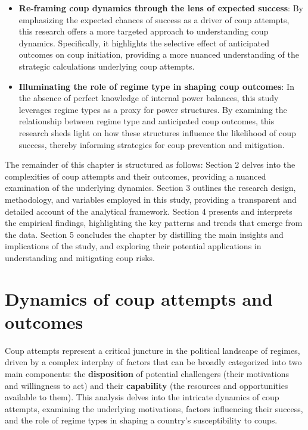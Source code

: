 \documentclass[
  12pt,
]{report}
\begin{document}
\begin{itemize}
\item
  \textbf{Re-framing coup dynamics through the lens of expected
  success}: By emphasizing the expected chances of success as a driver
  of coup attempts, this research offers a more targeted approach to
  understanding coup dynamics. Specifically, it highlights the selective
  effect of anticipated outcomes on coup initiation, providing a more
  nuanced understanding of the strategic calculations underlying coup
  attempts.
\item
  \textbf{Illuminating the role of regime type in shaping coup
  outcomes}: In the absence of perfect knowledge of internal power
  balances, this study leverages regime types as a proxy for power
  structures. By examining the relationship between regime type and
  anticipated coup outcomes, this research sheds light on how these
  structures influence the likelihood of coup success, thereby informing
  strategies for coup prevention and mitigation.
\end{itemize}

The remainder of this chapter is structured as follows: Section 2 delves
into the complexities of coup attempts and their outcomes, providing a
nuanced examination of the underlying dynamics. Section 3 outlines the
research design, methodology, and variables employed in this study,
providing a transparent and detailed account of the analytical
framework. Section 4 presents and interprets the empirical findings,
highlighting the key patterns and trends that emerge from the data.
Section 5 concludes the chapter by distilling the main insights and
implications of the study, and exploring their potential applications in
understanding and mitigating coup risks.

\section{Dynamics of coup attempts and
outcomes}\label{dynamics-of-coup-attempts-and-outcomes}

Coup attempts represent a critical juncture in the political landscape
of regimes, driven by a complex interplay of factors that can be broadly
categorized into two main components: the \textbf{disposition} of
potential challengers (their motivations and willingness to act) and
their \textbf{capability} (the resources and opportunities available to
them). This analysis delves into the intricate dynamics of coup
attempts, examining the underlying motivations, factors influencing
their success, and the role of regime types in shaping a country's
susceptibility to coups.
\end{document}
